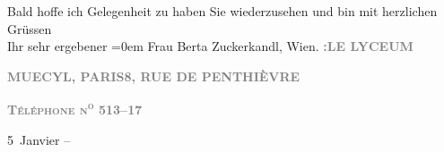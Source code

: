 \pstart
           Bald hoffe ich Gelegenheit zu haben Sie {\pb}wiederzusehen und bin mit herzlichen Grüssen{\\[\baselineskip]} Ihr sehr ergebener\pend
           \leftskip=0em{}{\vspace{1\baselineskip}}
\pstart
           \noindent{}Frau Berta Zuckerkandl, Wien.\pend
           \vspace{1em}
\pstart
           {\pb}\textcolor{gray}{\textbf{\label{K_L03945-5v}\label{K_L03945-5}:}}\hfill \textcolor{gray}{\textbf{LE LYCEUM}}\pend
           
\pstart
           \textcolor{gray}{\textbf{MUECYL, PARIS}}\hfill \textcolor{gray}{\textbf{8, RUE DE PENTHIÈVRE}}\pend
           
\pstart
           \textcolor{gray}{\textbf{\textsc{Téléphone n\textsuperscript{o} 513–17}}}\pend
           
\pstart
           \raggedleft{}5 Janvier –\pend
           
